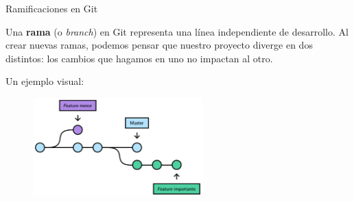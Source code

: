 



\begin{frame}[t]{Ramificaciones en Git}


    Una \textbf{rama} (o \textit{branch}) en Git representa una línea independiente de desarrollo.
    Al crear nuevas ramas, podemos pensar que nuestro proyecto diverge en dos distintos:
    los cambios que hagamos en uno no impactan al otro.

    \pause
    \vspace{0.5em}
    Un ejemplo visual:

    \begin{figure}[ht]
        \begin{center}
            \includegraphics[height=1.5in]{images/branch.pdf}
        \end{center}
    \end{figure}

\end{frame}



